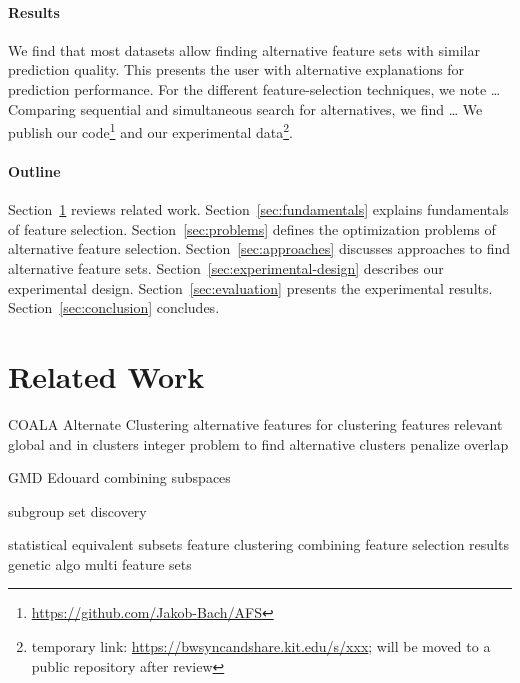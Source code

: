 \documentclass{article}
\theoremstyle{definition}
\begin{document}
\paragraph{Results}

We find that most datasets allow finding alternative feature sets with similar prediction quality.
This presents the user with alternative explanations for prediction performance.
For the different feature-selection techniques, we note \dots
Comparing sequential and simultaneous search for alternatives, we find \dots
We publish our code\footnote{\url{https://github.com/Jakob-Bach/AFS}} and our experimental data\footnote{temporary link: \url{https://bwsyncandshare.kit.edu/s/xxx}; will be moved to a public repository after review}.

\paragraph{Outline}

Section~\ref{sec:related-work} reviews related work.
Section~\ref{sec:fundamentals} explains fundamentals of feature selection.
Section~\ref{sec:problems} defines the optimization problems of alternative feature selection.
Section~\ref{sec:approaches} discusses approaches to find alternative feature sets.
Section~\ref{sec:experimental-design} describes our experimental design.
Section~\ref{sec:evaluation} presents the experimental results.
Section~\ref{sec:conclusion} concludes.

\section{Related Work}
\label{sec:related-work}

COALA \cite{bae2006coala}
Alternate Clustering \cite{bailey2014alternative}
alternative features for clustering \cite{tao2012novel}
features relevant global and in clusters \cite{guan2011unified}
integer problem to find alternative clusters \cite{bae2010clustering}
penalize overlap \cite{mueller2009relevant}

GMD \cite{trittenbach2019dimension}
Edouard \cite{fouche2021efficient}
combining subspaces \cite{nguyen20134s}

subgroup set discovery \cite{leeuwen2012diverse}

statistical equivalent subsets \cite{lagani2017feature, borboudakis2021extending, tsamardinos2003towards, dougherty2006number}
feature clustering \cite{mueller2021feature}
combining feature selection results \cite{woznica2012model}
genetic algo multi feature sets \cite{siddiqi2020genetic}
\end{document}
